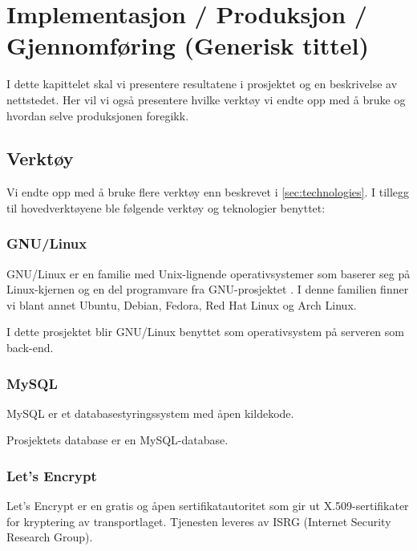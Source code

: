 \cleardoublepage
\chapter{Implementasjon / Produksjon / Gjennomføring (Generisk tittel)}
\label{chap:implementation} 
\clearpage


I dette kapittelet skal vi presentere resultatene i prosjektet og en beskrivelse av nettstedet. Her vil vi også presentere hvilke verktøy vi endte opp med å bruke og hvordan selve produksjonen foregikk.

\section{Verktøy}
Vi endte opp med å bruke flere verktøy enn beskrevet i  \ref{sec:technologies}. 
I tillegg til hovedverktøyene ble følgende verktøy og teknologier benyttet:

\subsection{GNU/Linux}
GNU/Linux er en familie med Unix-lignende operativsystemer som baserer seg på Linux-kjernen \cite{kernel_org} og en del programvare fra GNU-prosjektet \cite{gnu_org}. I denne familien finner vi blant annet Ubuntu, Debian, Fedora, Red Hat Linux og Arch Linux.

I dette prosjektet blir GNU/Linux benyttet som operativsystem på serveren som  back-end.

\subsection{MySQL}
MySQL \cite{oracle2019am} er et databasestyringssystem med åpen kildekode.

Prosjektets database er en MySQL-database.

\subsection{Let’s Encrypt}
Let’s Encrypt \cite{le2019ale} er en gratis og åpen sertifikatautoritet som gir ut X.509-sertifikater for kryptering av transportlaget. Tjenesten leveres av ISRG (Internet Security Research Group).


